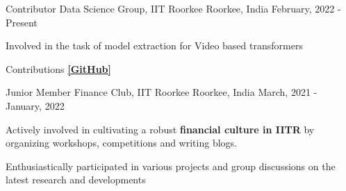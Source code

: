 \begin{cventries}
  \cventry
{Contributor} %
{Data Science Group, IIT Roorkee} %
{Roorkee, India} %
{February, 2022 - Present} %
{
	\begin{cvitems} %
		\item {Involved in the task of model extraction for Video based transformers}
		\item {Contributions  {\href{https://github.com/dsgiitr/BOSCH-MODEL-EXTRACTION-ATTACK-FOR-VIDEO-CLASSIFICATION/graphs/contributors}{\bf [GitHub]}}}
	\end{cvitems}
}

  \cventry
{Junior Member} %
{Finance Club, IIT Roorkee} %
{Roorkee, India} %
{March, 2021 - January, 2022} %
{
	\begin{cvitems} %
		\item {Actively involved in cultivating a robust \textbf{financial culture in IITR} by organizing workshops, competitions and writing blogs.}
		\item {Enthusiastically participated in various projects and group discussions on the latest research and developments}
	\end{cvitems}
}

\end{cventries}
